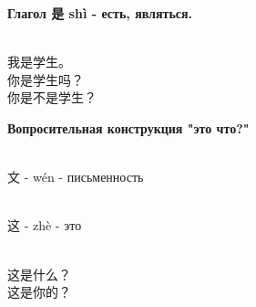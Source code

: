 \textbf{Глагол 是 shì - есть, являться.}
\begin{example}\hfill\\
	我是学生。\\
	你是学生吗？\\
	你是不是学生？
\end{example}
\textbf{Вопросительная конструкция "это что?"}
\begin{newgraphem}\hfill\\
	文 - wén - письменность
\end{newgraphem}
\begin{newword}\hfill\\
	这 - zhè - это
\end{newword}
\begin{example}\hfill\\
	这是什么？\\
	这是你的？
\end{example}